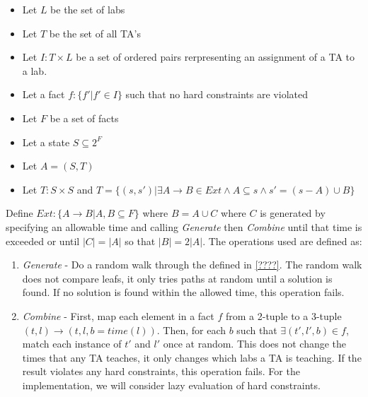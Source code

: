 \documentclass{article}
\begin{document}
\begin{itemize}

\item Let $L$ be the set of labs\\

\item Let $T$ be the set of all TA's\\

\item Let $I : T \times L$ be a set of ordered pairs rerpresenting an
  assignment of a TA to a lab.\\

\item Let a fact $f : \{ f' | f' \in I \}$ such that no hard constraints are
  violated\\

\item Let $F$ be a set of facts\\

\item Let a state $S \subseteq 2^F$\\

\item Let $A = (S, T)$\\

\item Let $T: S \times S$ and $T = \{ (s,s')| \exists A \to B \in Ext \land A
  \subseteq s \land s' =(s-A) \cup B \}$ \\

\end{itemize}

Define $Ext : \lbrace A \to B | A,B \subseteq F \rbrace$ where $B = A
\cup C$ where $C$ is generated by specifying an allowable time and
calling \textit{Generate} then \textit{Combine} until that time is
exceeded or until $|C| = |A|$ so that $|B| = 2|A|$. The operations
used are defined as:

\begin{enumerate}

\item \textit{Generate} - Do a random walk through the defined in
  \ref{????}. The random walk does not compare leafs, it only tries
  paths at random until a solution is found. If no solution is found
  within the allowed time, this operation fails.

\item \textit{Combine} - First, map each element in a fact $f$ from a
  2-tuple to a 3-tuple $(t, l) \to (t, l, b = time(l))$. Then, for
  each $b$ such that $\exists (t',l',b) \in f$, match each instance of
  $t'$ and $l'$ once at random. This does not change the times that
  any TA teaches, it only changes which labs a TA is teaching. If the
  result violates any hard constraints, this operation fails. For the
  implementation, we will consider lazy evaluation of hard
  constraints.
\end{enumerate}
\end{document}
